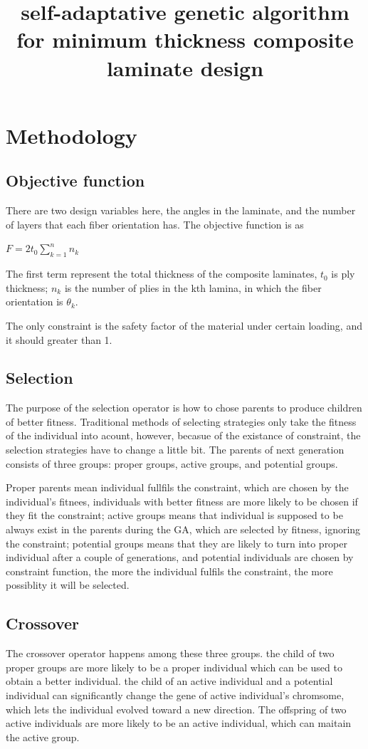 \documentclass{article}
\begin{document}
\title{self-adaptative genetic algorithm for minimum thickness composite laminate design}


\section{Methodology}
\subsection{Objective function}
There are two design variables here, the angles in the laminate, and the number of layers that each
fiber orientation has. The objective function is as

$F  = 2t_0 \sum_{k=1}^n n_k$ 

The first term represent the total thickness of the composite laminates, $t_0$ is ply thickness;
$n_k$ is the number of plies in the kth lamina, in which the fiber orientation is $\theta_k$.

The only constraint is the safety factor of the material under certain loading, and it should
greater than 1.

\subsection{Selection}
The purpose of the selection operator is how to chose parents to produce children of better
fitness. Traditional methods of selecting strategies only take the fitness of the individual into
acount, however, becasue of the existance of constraint, the selection strategies have to change a
little bit. The parents of next generation consists of three groups: proper groups, active groups,
and potential groups. 

Proper parents mean individual fullfils the constraint, which are chosen by the individual's
fitnees, individuals with better fitness are more likely to be chosen if they fit the constraint;
active groups means that individual is supposed to be always exist in the parents during the GA,
which are selected by fitness, ignoring the constraint; potential groups means that they are likely
to turn into proper individual after a couple of generations, and potential individuals are chosen
by constraint function, the more the individual fulfils the constraint, the more possiblity it will
be selected.


	
\subsection{Crossover}
The crossover operator happens among these three groups. the child of two proper groups are more
likely to be a proper individual which can be used to obtain a better individual. the child of an
active individual and a potential individual can significantly change the gene of active
individual's chromsome, which lets the individual evolved toward a new direction.  The offspring of
two active individuals are more likely to be an active individual, which can maitain the active
group.
\end{document}
